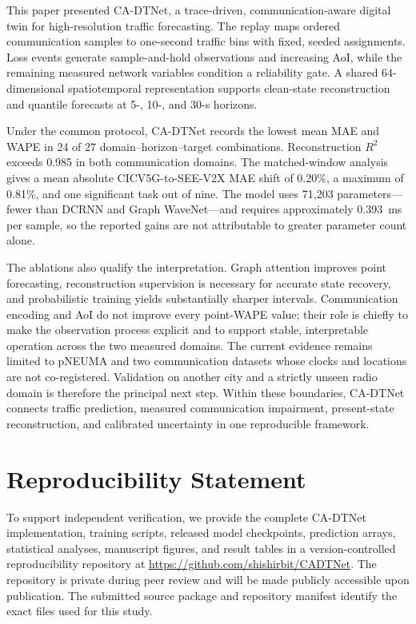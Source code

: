 \documentclass[pdflatex,sn-mathphys-num]{sn-jnl}%
\newenvironment{changed}{}{}
\theoremstyle{thmstyleone}%
\theoremstyle{thmstyletwo}%
\theoremstyle{thmstylethree}%
\begin{document}
\begin{changed}
This paper presented CA-DTNet, a trace-driven, communication-aware digital twin for high-resolution traffic forecasting. The replay maps ordered communication samples to one-second traffic bins with fixed, seeded assignments. Loss events generate sample-and-hold observations and increasing AoI, while the remaining measured network variables condition a reliability gate. A shared 64-dimensional spatiotemporal representation supports clean-state reconstruction and quantile forecasts at 5-, 10-, and 30-s horizons.

Under the common protocol, CA-DTNet records the lowest mean MAE and WAPE in 24 of 27 domain--horizon--target combinations. Reconstruction \(R^{2}\) exceeds 0.985 in both communication domains. The matched-window analysis gives a mean absolute CICV5G-to-SEE-V2X MAE shift of 0.20\%, a maximum of 0.81\%, and one significant task out of nine. The model uses 71,203 parameters---fewer than DCRNN and Graph WaveNet---and requires approximately 0.393~ms per sample, so the reported gains are not attributable to greater parameter count alone.

The ablations also qualify the interpretation. Graph attention improves point forecasting, reconstruction supervision is necessary for accurate state recovery, and probabilistic training yields substantially sharper intervals. Communication encoding and AoI do not improve every point-WAPE value; their role is chiefly to make the observation process explicit and to support stable, interpretable operation across the two measured domains. The current evidence remains limited to pNEUMA and two communication datasets whose clocks and locations are not co-registered. Validation on another city and a strictly unseen radio domain is therefore the principal next step. Within these boundaries, CA-DTNet connects traffic prediction, measured communication impairment, present-state reconstruction, and calibrated uncertainty in one reproducible framework.
\end{changed}

\section*{Reproducibility Statement}

To support independent verification, we provide the complete CA-DTNet
implementation, training scripts, released model checkpoints, prediction
arrays, statistical analyses, manuscript figures, and result tables in a
version-controlled reproducibility repository at
\url{https://github.com/shishirbit/CADTNet}. The repository is private during
peer review and will be made publicly accessible upon publication. The
submitted source package and repository manifest identify the exact files used
for this study.
\end{document}
